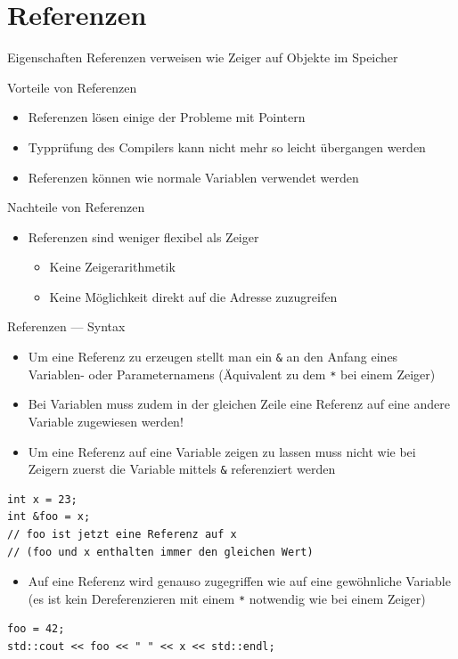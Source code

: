 \documentclass[presentation]{beamer}
\begin{document}
\section{Referenzen}
\label{sec:org7493371}
\begin{frame}[label={sec:org381fe3d}]{Eigenschaften}
Referenzen verweisen wie Zeiger auf Objekte im Speicher
\begin{block}{Vorteile von Referenzen}
\begin{itemize}
\item Referenzen lösen einige der Probleme mit Pointern
\item Typprüfung des Compilers kann nicht mehr so leicht übergangen werden
\item Referenzen können wie normale Variablen verwendet werden
\end{itemize}
\end{block}
\begin{block}{Nachteile von Referenzen}
\begin{itemize}
\item Referenzen sind weniger flexibel als Zeiger
\begin{itemize}
\item Keine Zeigerarithmetik
\item Keine Möglichkeit direkt auf die Adresse zuzugreifen
\end{itemize}
\end{itemize}
\end{block}
\end{frame}
\begin{frame}[fragile,label={sec:orgbe73db8}]{Referenzen --- Syntax}
 \begin{itemize}
\item Um eine Referenz zu erzeugen stellt man ein {\color{solarizedYellow}\texttt{\&} }an den Anfang eines
Variablen- oder Parameternamens (Äquivalent zu dem {\color{solarizedYellow}\texttt{*} }bei einem
Zeiger)
\item \alert{Bei Variablen muss zudem in der gleichen Zeile eine Referenz auf
eine andere Variable zugewiesen werden!}
\item Um eine Referenz auf eine Variable zeigen zu lassen muss nicht wie
bei Zeigern zuerst die Variable mittels {\color{solarizedYellow}\texttt{\&} }referenziert werden
\end{itemize}
\begin{verbatim}
int x = 23;
int &foo = x;
// foo ist jetzt eine Referenz auf x 
// (foo und x enthalten immer den gleichen Wert)
\end{verbatim}
\begin{itemize}
\item Auf eine Referenz wird genauso zugegriffen wie auf eine gewöhnliche
Variable (es ist kein Dereferenzieren mit einem {\color{solarizedYellow}\texttt{*} }notwendig wie
bei einem Zeiger)
\end{itemize}
\begin{verbatim}
foo = 42;
std::cout << foo << " " << x << std::endl;
\end{verbatim}
\end{frame}
\end{document}
